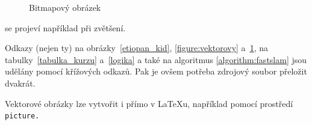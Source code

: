 \documentclass[czech,a4paper, 11pt]{article}
\begin{document}
\begin{figure}[h]
\begin{center}

		
\caption{Bitmapový obrázek}
	\label{figure:rastrovy}
\end{center}
\end{figure}
\bigskip
\noindent se projeví například při zvětšení.

Odkazy (nejen ty) na obrázky~\ref{etiopan_kid}, \ref{figure:vektorovy} a~\ref{figure:rastrovy}, na
tabulky~\ref{tabulka_kurzu} a~\ref{logika} a také na algoritmus \ref{algorithm:fastslam} jsou udělány pomocí křížových odkazů. Pak je ovšem potřeba zdrojový soubor přeložit dvakrát.

Vektorové obrázky lze vytvořit i přímo v {\LaTeX}u, například pomocí prostředí\texttt{ picture.}
\end{document}

